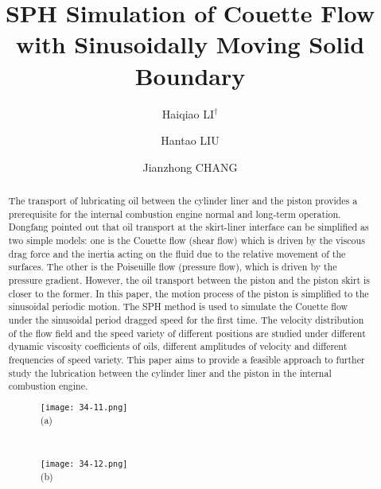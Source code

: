 \documentclass[10pt]{article}
\title{SPH Simulation of Couette Flow with Sinusoidally Moving Solid Boundary}
\date{}
\author[$\relax$]{Haiqiao LI$^\dagger$}
\author[$\relax$]{Hantao LIU}
\author[$\relax$]{Jianzhong CHANG}
\affil[$\relax$]{Laboratory of Energy and Environment and Computational Fluid Dynamics, North University of China, Taiyuan, China}
\affil[$\relax$]{\email{\dagger}{Lihaiqiao8@sina.com}}
\begin{document}
\maketitle


\begin{abstract}
The transport of lubricating oil between the cylinder liner and the piston provides a prerequisite for the internal combustion engine normal and long-term operation. Dongfang \cite{bai2012modeling} pointed out that oil transport at the skirt-liner interface can be simplified as two simple models: one is the Couette flow (shear flow) which is driven by the viscous drag force and the inertia acting on the fluid due to the relative movement of the surfaces. The other is the Poiseuille flow (pressure flow), which is driven by the pressure gradient. However, the oil transport between the piston and the piston skirt is closer to the former. In this paper, the motion process of the piston is simplified to the sinusoidal periodic motion. The SPH method \cite{liu2003smoothed} is used to simulate the Couette flow under the sinusoidal period dragged speed for the first time. The velocity distribution of the flow field and the speed variety of different positions are studied under different dynamic viscosity coefficients of oils, different amplitudes of velocity and different frequencies of speed variety. This paper aims to provide a feasible approach to further study the lubrication between the cylinder liner and the piston in the internal combustion engine.

\begin{figure}[!htb]
\begin{minipage}[t]{0.46\linewidth}
\centering
\texttt{[image: 34-11.png]}\\
(a)
\end{minipage}
\begin{minipage}[t]{0.05\linewidth}
~
\end{minipage}
\begin{minipage}[t]{0.46\linewidth}
\centering
\texttt{[image: 34-12.png]}\\
(b)
\end{minipage}


\end{figure}
\end{abstract}
\end{document}
